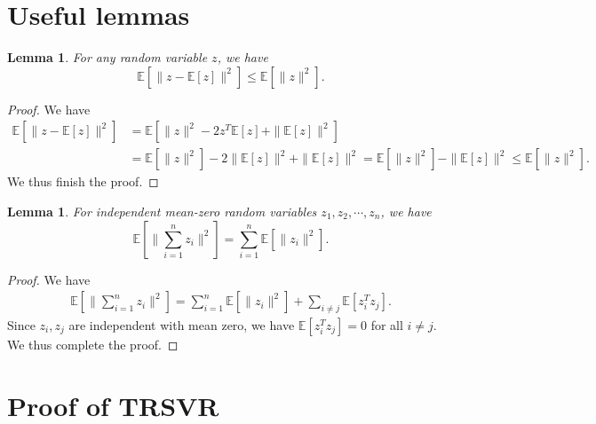 \documentclass{article}
\theoremstyle{plain}
\newtheorem{lemma}[theorem]{Lemma}
\theoremstyle{definition}
\theoremstyle{remark}
\begin{document}
%


\newpage
\appendix
\onecolumn
\section{Useful lemmas}\label{append_A}
\begin{lemma}\label{lemma:A1}
For any random variable $z$, we have
    \begin{equation*}
        \mathbb{E}[\|z-\mathbb{E}[z]\|^2] \leq \mathbb{E}[\|z\|^2].
    \end{equation*}
\end{lemma}
\begin{proof}
We have
    \begin{align*}
        \mathbb{E}[\|z-\mathbb{E}[z]\|^2] & = \mathbb{E}[\|z\|^2-2z^T\mathbb{E}[z] + \|\mathbb{E}[z] \|^2] \\
        & = \mathbb{E}[\|z\|^2] - 2 \|\mathbb{E}[z]\|^2 + \|\mathbb{E}[z] \|^2 =  \mathbb{E}[\|z\|^2] -  \|\mathbb{E}[z]\|^2 \leq \mathbb{E}[\|z\|^2].
    \end{align*}
    We thus finish the proof.
\end{proof}

\begin{lemma}\label{lemma:A2}
    For independent mean-zero random variables $z_1, z_2,\cdots, z_n$, we have
\begin{equation*}
   \mathbb{E}[\|\sum_{i=1}^n z_i \|^2] = \sum_{i=1}^n\mathbb{E}[\|z_i\|^2] .
\end{equation*}
\end{lemma}

\begin{proof}
    We have
    \begin{align*}
        \mathbb{E}[\|\sum_{i=1}^n z_i \|^2] = \sum_{i=1}^n \mathbb{E}[\|z_i \|^2] + \sum_{i\neq j} \mathbb{E}[z_i^Tz_j].
    \end{align*}
    Since $z_i,z_j$ are independent with mean zero, we have $\mathbb{E}[z_i^Tz_j]=0$ for all $i\neq j$. We thus complete the proof.
\end{proof}




\section{Proof of TRSVR}\label{append_B}
\end{document}
